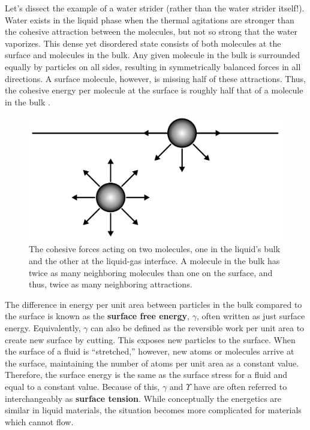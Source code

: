 Let's dissect the example of a water strider (rather than the water strider itself!). Water exists in the liquid phase when the thermal agitations are stronger than the cohesive attraction between the molecules, but not so strong that the water vaporizes. This dense yet disordered state consists of both molecules at the surface and molecules in the bulk. Any given molecule in the bulk is surrounded equally by particles on all sides, resulting in symmetrically balanced forces in all directions. A surface molecule, however, is missing half of these attractions. Thus, the cohesive energy per molecule at the surface is roughly half that of a molecule in the bulk \cite{GennesPierre-Gillesde2003Cawp}. 
\begin{figure}
	\centering
	\includegraphics[width=0.7\linewidth]{Chapters/Figures/surface_energy_origin}
	\caption[Surface Free Energy]{The cohesive forces acting on two molecules, one in the liquid's bulk and the other at the liquid-gas interface. A molecule in the bulk has twice as many neighboring molecules than one on the surface, and thus, twice as many neighboring attractions. }
	\label{fig:surfaceenergyorigin}
\end{figure}
The difference in energy per unit area between particles in the bulk compared to the surface is known as the \textbf{surface free energy}, $\gamma$, often written as just surface energy. Equivalently, $\gamma$ can also be defined as the reversible work per unit area to create new surface by cutting. This exposes new particles to the surface. When the surface of a fluid is ``stretched,'' however, new atoms or molecules arrive at the surface, maintaining the number of atoms per unit area as a constant value. Therefore, the surface energy is the same as the surface stress for a fluid and equal to a constant value. Because of this, $\gamma$ and $\Upsilon$ have are often referred to interchangeably as \textbf{surface tension}. While conceptually the energetics are similar in liquid materials, the situation becomes more complicated for materials which cannot flow.


